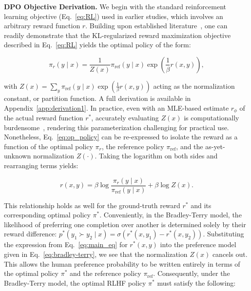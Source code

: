 \textbf{DPO Objective Derivation.} We begin with the standard reinforcement learning objective (Eq.~\ref{eq:RL}) used in earlier studies, which involves an arbitrary reward function $r$. Building upon established literature~\citep{peters2007reinforcement, peng2019advantage, korbak2022reinforcement, go2023aligning}, one can readily demonstrate that the KL-regularized reward maximization objective described in Eq.~\ref{eq:RL} yields the optimal policy of the form:

\begin{equation}\label{eq:op_policy}
    \pi_r(y\mid x) = \frac{1}{Z(x)}\pi_\text{ref}(y\mid x)\exp\left(\frac{1}{\beta}r(x, y)\right),
\end{equation}

with $Z(x) = \sum_{y}\pi_\text{ref}(y\mid x)\exp\left(\frac{1}{\beta}r(x, y)\right)$ acting as the normalization constant, or partition function. A full derivation is available in Appendix~\ref{app:derivation1}. In practice, even with an MLE-based estimate $r_\phi$ of the actual reward function $r^*$, accurately evaluating $Z(x)$ is computationally burdensome~\citep{korbak2022reinforcement, go2023aligning}, rendering this parameterization challenging for practical use. Nonetheless, Eq.~\ref{eq:op_policy} can be re-expressed to isolate the reward as a function of the optimal policy $\pi_r$, the reference policy $\pi_\text{ref}$, and the as-yet-unknown normalization $Z(\cdot)$. Taking the logarithm on both sides and rearranging terms yields:

\begin{equation}\label{eq:main_eq}
    r(x,y) = \beta \log \frac{\pi_r(y\mid x)}{\pi_\text{ref}(y\mid x)} + \beta \log Z(x).
\end{equation}

This relationship holds as well for the ground-truth reward $r^*$ and its corresponding optimal policy $\pi^*$. Conveniently, in the Bradley-Terry model, the likelihood of preferring one completion over another is determined solely by their reward difference: ${p^*(y_1 \succ y_2 \mid x) = \sigma(r^*(x, y_1) - r^*(x, y_2))}$. Substituting the expression from Eq.~\ref{eq:main_eq} for $r^*(x, y)$ into the preference model given in Eq.~\ref{eq:bradley-terry}, we see that the normalization $Z(x)$ cancels out. This allows the human preference probability to be written entirely in terms of the optimal policy $\pi^*$ and the reference policy $\pi_\text{ref}$. Consequently, under the Bradley-Terry model, the optimal RLHF policy $\pi^*$ must satisfy the following:

